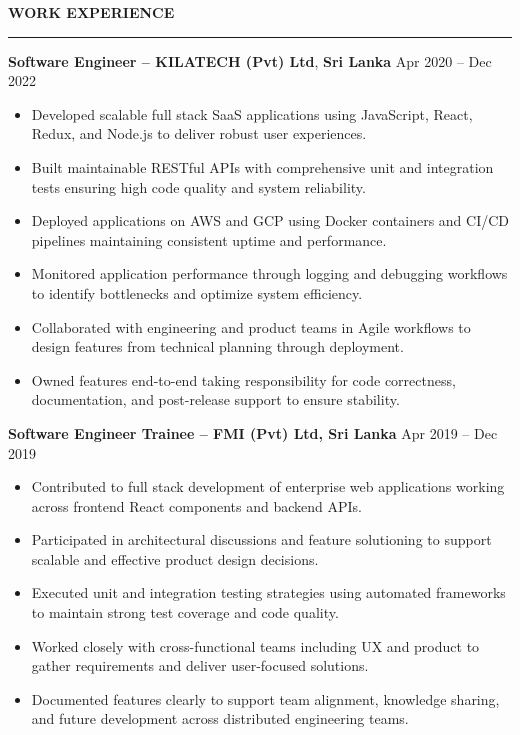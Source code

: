 \documentclass[10pt,letterpaper]{article}
\begin{document}
\vspace{8pt}

\textbf{WORK EXPERIENCE}\\[-8pt]
\noindent\rule{\textwidth}{1pt}

\vspace{-2pt}

\textbf{Software Engineer -- KILATECH (Pvt) Ltd}, \textbf{Sri Lanka} \hfill Apr 2020 -- Dec 2022

\vspace{-1pt}

\begin{itemize}
\item Developed scalable full stack SaaS applications using JavaScript, React, Redux, and Node.js to deliver robust user experiences.
\item Built maintainable RESTful APIs with comprehensive unit and integration tests ensuring high code quality and system reliability.
\item Deployed applications on AWS and GCP using Docker containers and CI/CD pipelines maintaining consistent uptime and performance.
\item Monitored application performance through logging and debugging workflows to identify bottlenecks and optimize system efficiency.
\item Collaborated with engineering and product teams in Agile workflows to design features from technical planning through deployment.
\item Owned features end-to-end taking responsibility for code correctness, documentation, and post-release support to ensure stability.
\end{itemize}

\textbf{Software Engineer Trainee -- FMI (Pvt) Ltd, Sri Lanka} \hfill Apr 2019 -- Dec 2019

\vspace{-1pt}

\begin{itemize}
\item Contributed to full stack development of enterprise web applications working across frontend React components and backend APIs.
\item Participated in architectural discussions and feature solutioning to support scalable and effective product design decisions.
\item Executed unit and integration testing strategies using automated frameworks to maintain strong test coverage and code quality.
\item Worked closely with cross-functional teams including UX and product to gather requirements and deliver user-focused solutions.
\item Documented features clearly to support team alignment, knowledge sharing, and future development across distributed engineering teams.
\end{itemize}
\end{document}
